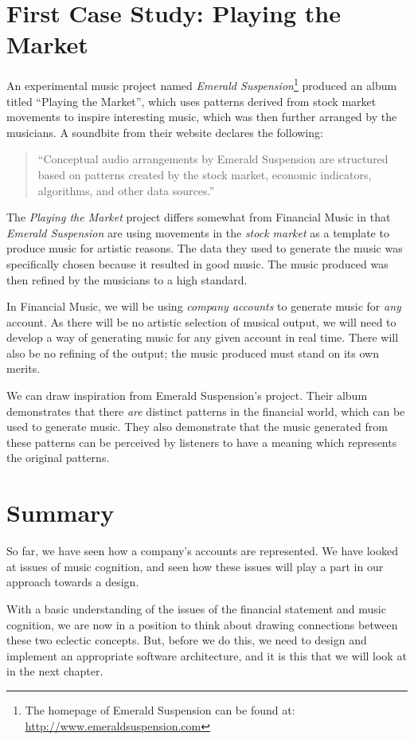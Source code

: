 \section{First Case Study: Playing the Market}

An experimental music project named \textit{Emerald Suspension}\footnote{The homepage of Emerald Suspension can be found at: \url{http://www.emeraldsuspension.com}} produced an album titled ``Playing the Market'', which uses patterns derived from stock market movements to inspire interesting music, which was then further arranged by the musicians. A soundbite from their website declares the following:

\begin{quote}
``Conceptual audio arrangements by Emerald Suspension are structured based on patterns created by the stock market, economic indicators, algorithms, and other data sources.''
\end{quote}

\noindent The \textit{Playing the Market} project differs somewhat from Financial Music in that \textit{Emerald Suspension} are using movements in the \textit{stock market} as a template to produce music for artistic reasons. The data they used to generate the music was specifically chosen because it resulted in good music. The music produced was then refined by the musicians to a high standard.

In Financial Music, we will be using \textit{company accounts} to generate music for \textit{any} account. As there will be no artistic selection of musical output, we will need to develop a way of generating music for any given account in real time. There will also be no refining of the output; the music produced must stand on its own merits.

We can draw inspiration from Emerald Suspension's project. Their album demonstrates that there \textit{are} distinct patterns in the financial world, which can be used to generate music. They also demonstrate that the music generated from these patterns can be perceived by listeners to have a meaning which represents the original patterns.

\section{Summary}

So far, we have seen how a company's accounts are represented. We have looked at issues of music cognition, and seen how these issues will play a part in our approach towards a design.

With a basic understanding of the issues of the financial statement and music cognition, we are now in a position to think about drawing connections between these two eclectic concepts. But, before we do this, we need to design and implement an appropriate software architecture, and it is this that we will look at in the next chapter.